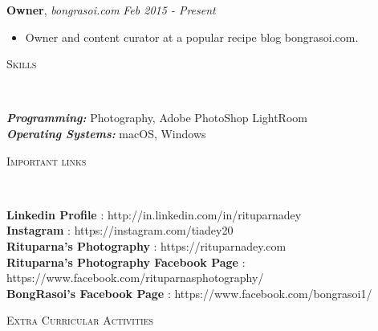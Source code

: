 \documentclass[9pt]{article}
\newenvironment{changemargin}[2]{%
  \begin{list}{}{%
    \setlength{\topsep}{0pt}%
    \setlength{\leftmargin}{#1}%
    \setlength{\rightmargin}{#2}%
    \setlength{\listparindent}{\parindent}%
    \setlength{\itemindent}{\parindent}%
    \setlength{\parsep}{\parskip}%
  }%
  \item[]}{\end{list}
}
\newcommand{\lineover}{
	\begin{changemargin}{-0.05in}{-0.05in}
		\vspace*{-8pt}
		\hrulefill \\
		\vspace*{-2pt}
	\end{changemargin}
}
\newcommand{\header}[1]{
	\begin{changemargin}{-0.5in}{-0.5in}
		\scshape{#1}\\
  	\lineover
	\end{changemargin}
}
\newenvironment{body} {
	\vspace*{-16pt}
	\begin{changemargin}{-0.25in}{-0.5in}
  }
	{\end{changemargin}
}
\begin{document}
\begin{body}
	\vspace{14pt}
	\textbf{Owner}, \emph{bongrasoi.com} \hfill \emph{Feb 2015 - Present}\\
	\begin{itemize}
		\item Owner and content curator at a popular recipe blog bongrasoi.com.\\
	\end{itemize}
	\vspace*{-4pt}
\end{body}

\smallskip


\header{Skills}

\begin{body}
	\vspace{14pt}
	\emph{\textbf{Programming:}}{} Photography, Adobe PhotoShop LightRoom\\
	\medskip
	\emph{\textbf{Operating Systems:}}{} macOS, Windows\\
\end{body}

\smallskip


\header{Important links}

\begin{body}
	\vspace{14pt}
	\smallskip
	\textbf{Linkedin Profile} : http://in.linkedin.com/in/rituparnadey \hfill{}\\
  \textbf{Instagram} : https://instagram.com/tiadey20 \hfill{}\\
  \textbf{Rituparna's Photography} : https://rituparnadey.com \hfill{}\\
  \textbf{Rituparna's Photography Facebook Page} : https://www.facebook.com/rituparnasphotography/ \hfill{}\\
  \textbf{BongRasoi's Facebook Page} : https://www.facebook.com/bongrasoi1/ \hfill{}\\
	\smallskip
\end{body}

\smallskip

\header{Extra Curricular Activities}
\end{document}

